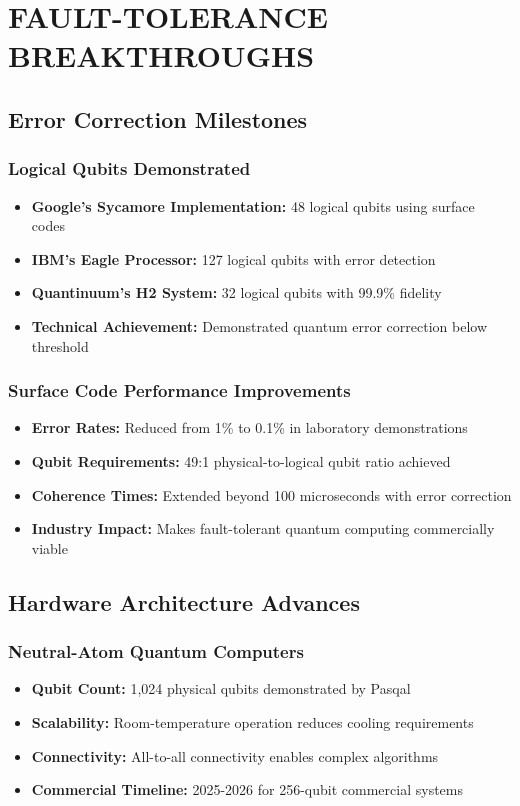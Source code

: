 \documentclass[12pt,a4paper]{article}
\begin{document}
\section{FAULT-TOLERANCE BREAKTHROUGHS}

\subsection{Error Correction Milestones}

\subsubsection{Logical Qubits Demonstrated}
\begin{itemize}
    \item \textbf{Google's Sycamore Implementation:} 48 logical qubits using surface codes
    \item \textbf{IBM's Eagle Processor:} 127 logical qubits with error detection
    \item \textbf{Quantinuum's H2 System:} 32 logical qubits with 99.9\% fidelity
    \item \textbf{Technical Achievement:} Demonstrated quantum error correction below threshold
\end{itemize}

\subsubsection{Surface Code Performance Improvements}
\begin{itemize}
    \item \textbf{Error Rates:} Reduced from 1\% to 0.1\% in laboratory demonstrations
    \item \textbf{Qubit Requirements:} 49:1 physical-to-logical qubit ratio achieved
    \item \textbf{Coherence Times:} Extended beyond 100 microseconds with error correction
    \item \textbf{Industry Impact:} Makes fault-tolerant quantum computing commercially viable
\end{itemize}

\subsection{Hardware Architecture Advances}

\subsubsection{Neutral-Atom Quantum Computers}
\begin{itemize}
    \item \textbf{Qubit Count:} 1,024 physical qubits demonstrated by Pasqal
    \item \textbf{Scalability:} Room-temperature operation reduces cooling requirements
    \item \textbf{Connectivity:} All-to-all connectivity enables complex algorithms
    \item \textbf{Commercial Timeline:} 2025-2026 for 256-qubit commercial systems
\end{itemize}
\end{document}
